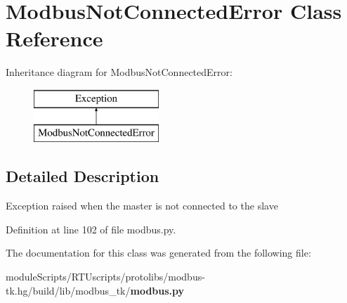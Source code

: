 \section{Modbus\+Not\+Connected\+Error Class Reference}
\label{classmodbus__tk_1_1modbus_1_1_modbus_not_connected_error}
Inheritance diagram for Modbus\+Not\+Connected\+Error\+:\begin{figure}[H]
\begin{center}
\leavevmode
\includegraphics[height=2.000000cm]{classmodbus__tk_1_1modbus_1_1_modbus_not_connected_error}
\end{center}
\end{figure}


\subsection{Detailed Description}
\begin{DoxyVerb}Exception raised when the master is not connected to the slave 
\end{DoxyVerb}
 

Definition at line 102 of file modbus.\+py.



The documentation for this class was generated from the following file\+:\begin{DoxyCompactItemize}
\item 
module\+Scripts/\+R\+T\+Uscripts/protolibs/modbus-\/tk.\+hg/build/lib/modbus\+\_\+tk/{\bf modbus.\+py}\end{DoxyCompactItemize}
